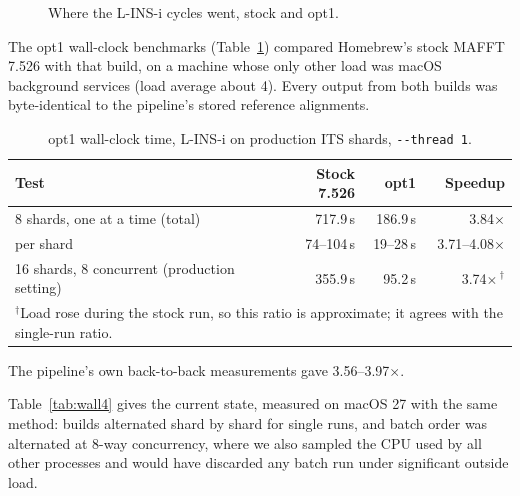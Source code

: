\documentclass[11pt]{article}
\newcommand{\code}[1]{\texttt{#1}}
\begin{document}
\begin{figure}[h]
\centering
{}
\caption{Where the L-INS-i cycles went, stock and opt1.}
\end{figure}

The opt1 wall-clock benchmarks (Table~\ref{tab:wall}) compared Homebrew's stock MAFFT 7.526
with that build, on a machine whose only other load was macOS background services (load
average about 4). Every output from both builds was byte-identical to the pipeline's stored
reference alignments.

\begin{table}[h]
\centering
\caption{opt1 wall-clock time, L-INS-i on production ITS shards, \code{-{}-thread 1}.}
\label{tab:wall}
\begin{tabular}{lrrr}
\toprule
Test & Stock 7.526 & opt1 & Speedup \\
\midrule
8 shards, one at a time (total) & 717.9\,s & 186.9\,s & 3.84$\times$ \\
\quad per shard & 74--104\,s & 19--28\,s & 3.71--4.08$\times$ \\
16 shards, 8 concurrent (production setting) & 355.9\,s & 95.2\,s & 3.74$\times$\,$^\dagger$ \\
\bottomrule
\multicolumn{4}{l}{\footnotesize $^\dagger$Load rose during the stock run, so this ratio is
approximate; it agrees with the single-run ratio.}
\end{tabular}
\end{table}

The pipeline's own back-to-back measurements gave 3.56--3.97$\times$.

Table~\ref{tab:wall4} gives the current state, measured on macOS 27 with the same method:
builds alternated shard by shard for single runs, and batch order was alternated at 8-way
concurrency, where we also sampled the CPU used by all other processes and would have
discarded any batch run under significant outside load.
\end{document}
